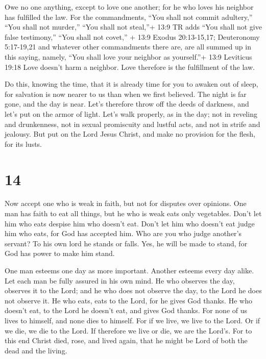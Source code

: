 Owe no one anything, except to love one another; for he who
loves his neighbor has fulfilled the law.  For the
commandments, ``You shall not commit adultery,'' ``You shall not
murder,'' ``You shall not steal,''+ 13:9 TR adds ``You shall not give
false testimony,'' ``You shall not covet,'' + 13:9 Exodus 20:13-15,17;
Deuteronomy 5:17-19,21 and whatever other commandments there are, are
all summed up in this saying, namely, ``You shall love your neighbor as
yourself.''+ 13:9 Leviticus 19:18  Love doesn't harm a
neighbor. Love therefore is the fulfillment of the law.

 Do this, knowing the time, that it is already time for you
to awaken out of sleep, for salvation is now nearer to us than when we
first believed.  The night is far gone, and the day is
near. Let's therefore throw off the deeds of darkness, and let's put on
the armor of light.  Let's walk properly, as in the day;
not in reveling and drunkenness, not in sexual promiscuity and lustful
acts, and not in strife and jealousy.  But put on the Lord
Jesus Christ, and make no provision for the flesh, for its lusts.

\hypertarget{section-13}{%
\section{14}\label{section-13}}

 Now accept one who is weak in faith, but not for disputes
over opinions.  One man has faith to eat all things, but he
who is weak eats only vegetables.  Don't let him who eats
despise him who doesn't eat. Don't let him who doesn't eat judge him who
eats, for God has accepted him.  Who are you who judge
another's servant? To his own lord he stands or falls. Yes, he will be
made to stand, for God has power to make him stand.

 One man esteems one day as more important. Another esteems
every day alike. Let each man be fully assured in his own mind.
 He who observes the day, observes it to the Lord; and he
who does not observe the day, to the Lord he does not observe it. He who
eats, eats to the Lord, for he gives God thanks. He who doesn't eat, to
the Lord he doesn't eat, and gives God thanks.  For none of
us lives to himself, and none dies to himself.  For if we
live, we live to the Lord. Or if we die, we die to the Lord. If
therefore we live or die, we are the Lord's.  For to this
end Christ died, rose, and lived again, that he might be Lord of both
the dead and the living.

